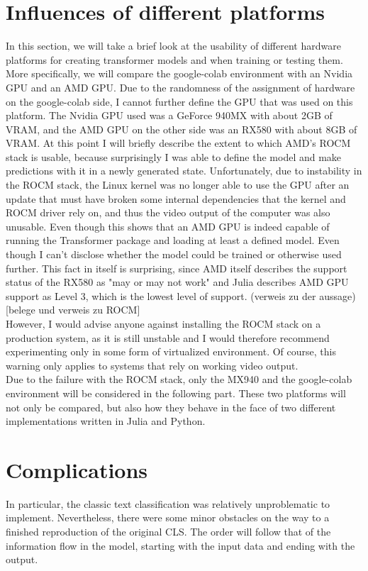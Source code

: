 \section{Influences of different platforms}
In this section, we will take a brief look at the usability of different hardware platforms for creating transformer models and when training or testing them. More specifically, we will compare the google-colab environment with an Nvidia GPU and an AMD GPU. Due to the randomness of the assignment of hardware on the google-colab side, I cannot further define the GPU that was used on this platform. The Nvidia GPU used was a GeForce 940MX with about 2GB of VRAM, and the AMD GPU on the other side was an RX580 with about 8GB of VRAM.
At this point I will briefly describe the extent to which AMD's ROCM stack is usable, because surprisingly I was able to define the model and make predictions with it in a newly generated state. Unfortunately, due to instability in the ROCM stack, the Linux kernel was no longer able to use the GPU after an update that must have broken some internal dependencies that the kernel and ROCM driver rely on, and thus the video output of the computer was also unusable. Even though this shows that an AMD GPU is indeed capable of running the Transformer package and loading at least a defined model. Even though I can't disclose whether the model could be trained or otherwise used further. This fact in itself is surprising, since AMD itself describes the support status of the RX580 as "may or may not work" and Julia describes AMD GPU support as Level 3, which is the lowest level of support. (verweis zu der aussage)[belege und verweis zu ROCM]\\
However, I would advise anyone against installing the ROCM stack on a production system, as it is still unstable and I would therefore recommend experimenting only in some form of virtualized environment. Of course, this warning only applies to systems that rely on working video output.\\
Due to the failure with the ROCM stack, only the MX940 and the google-colab environment will be considered in the following part. These two platforms will not only be compared, but also how they behave in the face of two different implementations written in Julia and Python.


\section{Complications}
In particular, the classic text classification was relatively unproblematic to implement. Nevertheless, there were some minor obstacles on the way to a finished reproduction of the original CLS. The order will follow that of the information flow in the model, starting with the input data and ending with the output.

